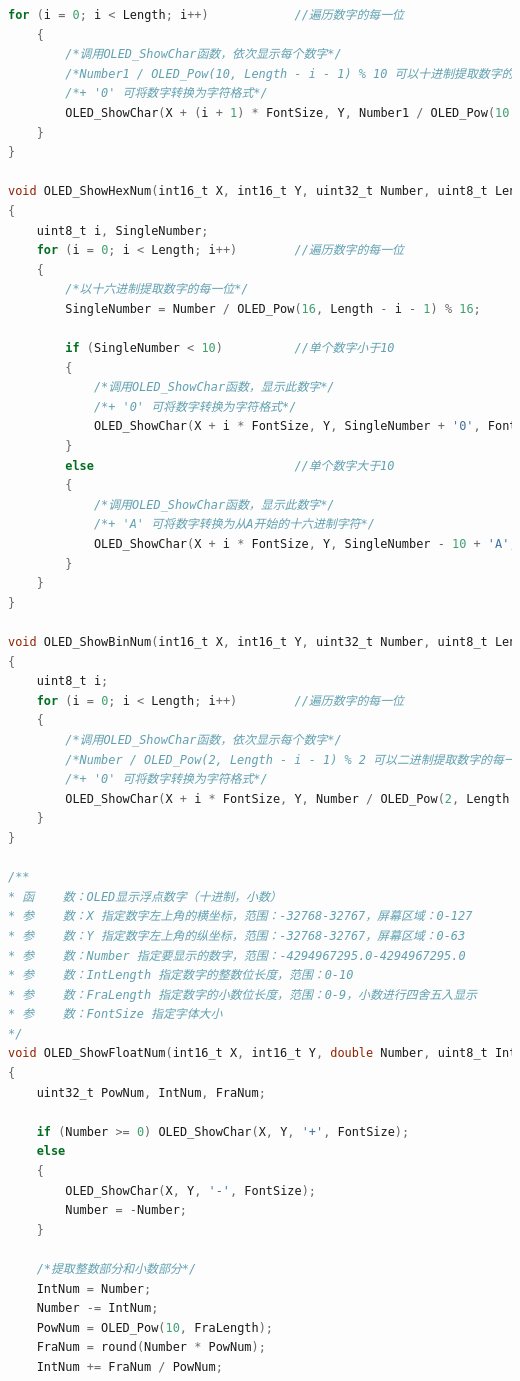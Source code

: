 \documentclass[UTF8]{ctexart}
\begin{document}
\begin{appendices}
\begin{lstlisting}[language=C, caption=OLED.c]
	for (i = 0; i < Length; i++)			//遍历数字的每一位								
	{
		/*调用OLED_ShowChar函数，依次显示每个数字*/
		/*Number1 / OLED_Pow(10, Length - i - 1) % 10 可以十进制提取数字的每一位*/
		/*+ '0' 可将数字转换为字符格式*/
		OLED_ShowChar(X + (i + 1) * FontSize, Y, Number1 / OLED_Pow(10, Length - i - 1) % 10 + '0', FontSize);
	}
}

void OLED_ShowHexNum(int16_t X, int16_t Y, uint32_t Number, uint8_t Length, uint8_t FontSize)
{
	uint8_t i, SingleNumber;
	for (i = 0; i < Length; i++)		//遍历数字的每一位
	{
		/*以十六进制提取数字的每一位*/
		SingleNumber = Number / OLED_Pow(16, Length - i - 1) % 16;
		
		if (SingleNumber < 10)			//单个数字小于10
		{
			/*调用OLED_ShowChar函数，显示此数字*/
			/*+ '0' 可将数字转换为字符格式*/
			OLED_ShowChar(X + i * FontSize, Y, SingleNumber + '0', FontSize);
		}
		else							//单个数字大于10
		{
			/*调用OLED_ShowChar函数，显示此数字*/
			/*+ 'A' 可将数字转换为从A开始的十六进制字符*/
			OLED_ShowChar(X + i * FontSize, Y, SingleNumber - 10 + 'A', FontSize);
		}
	}
}

void OLED_ShowBinNum(int16_t X, int16_t Y, uint32_t Number, uint8_t Length, uint8_t FontSize)
{
	uint8_t i;
	for (i = 0; i < Length; i++)		//遍历数字的每一位	
	{
		/*调用OLED_ShowChar函数，依次显示每个数字*/
		/*Number / OLED_Pow(2, Length - i - 1) % 2 可以二进制提取数字的每一位*/
		/*+ '0' 可将数字转换为字符格式*/
		OLED_ShowChar(X + i * FontSize, Y, Number / OLED_Pow(2, Length - i - 1) % 2 + '0', FontSize);
	}
}

/**
* 函    数：OLED显示浮点数字（十进制，小数）
* 参    数：X 指定数字左上角的横坐标，范围：-32768-32767，屏幕区域：0-127
* 参    数：Y 指定数字左上角的纵坐标，范围：-32768-32767，屏幕区域：0-63
* 参    数：Number 指定要显示的数字，范围：-4294967295.0-4294967295.0
* 参    数：IntLength 指定数字的整数位长度，范围：0-10
* 参    数：FraLength 指定数字的小数位长度，范围：0-9，小数进行四舍五入显示
* 参    数：FontSize 指定字体大小
*/
void OLED_ShowFloatNum(int16_t X, int16_t Y, double Number, uint8_t IntLength, uint8_t FraLength, uint8_t FontSize)
{
	uint32_t PowNum, IntNum, FraNum;
	
	if (Number >= 0) OLED_ShowChar(X, Y, '+', FontSize);	
	else				
	{
		OLED_ShowChar(X, Y, '-', FontSize);
		Number = -Number;		
	}
	
	/*提取整数部分和小数部分*/
	IntNum = Number;			
	Number -= IntNum;			
	PowNum = OLED_Pow(10, FraLength);
	FraNum = round(Number * PowNum);	
	IntNum += FraNum / PowNum;		
	

\end{lstlisting}
\end{appendices}
\end{document}
